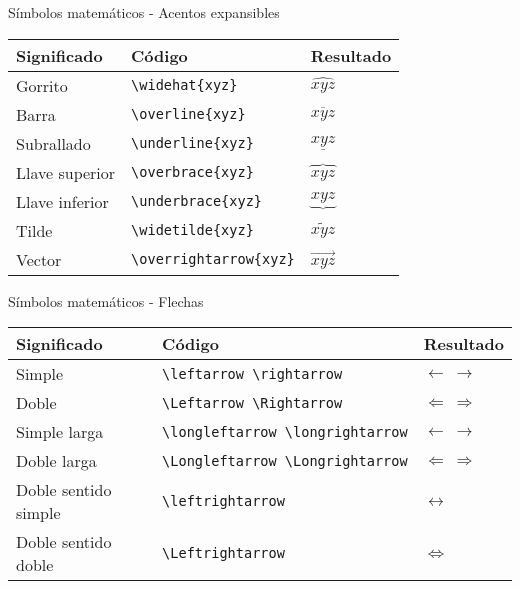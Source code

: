 \documentclass[
  ignorenonframetext,
]{beamer}
\begin{document}
\begin{frame}[fragile]{Símbolos matemáticos - Acentos expansibles}
\protect\hypertarget{suxedmbolos-matemuxe1ticos---acentos-expansibles}{}
\begin{longtable}[]{@{}lll@{}}
\toprule
Significado & Código & Resultado \\
\midrule
\endhead
Gorrito & \texttt{\textbackslash{}widehat\{xyz\}} & \(\widehat{xyz}\) \\
Barra & \texttt{\textbackslash{}overline\{xyz\}} & \(\overline{xyz}\) \\
Subrallado & \texttt{\textbackslash{}underline\{xyz\}} &
\(\underline{xyz}\) \\
Llave superior & \texttt{\textbackslash{}overbrace\{xyz\}} &
\(\overbrace{xyz}\) \\
Llave inferior & \texttt{\textbackslash{}underbrace\{xyz\}} &
\(\underbrace{xyz}\) \\
Tilde & \texttt{\textbackslash{}widetilde\{xyz\}} &
\(\widetilde{xyz}\) \\
Vector & \texttt{\textbackslash{}overrightarrow\{xyz\}} &
\(\overrightarrow{xyz}\) \\
\bottomrule
\end{longtable}
\end{frame}

\begin{frame}[fragile]{Símbolos matemáticos - Flechas}
\protect\hypertarget{suxedmbolos-matemuxe1ticos---flechas}{}
\begin{longtable}[]{@{}
  >{\raggedright\arraybackslash}p{}
  >{\raggedright\arraybackslash}p{}
  >{\raggedright\arraybackslash}p{}@{}}
\toprule
Significado & Código & Resultado \\
\midrule
\endhead
Simple & \texttt{\textbackslash{}leftarrow\ \textbackslash{}rightarrow}
& \(\leftarrow\ \rightarrow\) \\
Doble & \texttt{\textbackslash{}Leftarrow\ \textbackslash{}Rightarrow} &
\(\Leftarrow\ \Rightarrow\) \\
Simple larga &
\texttt{\textbackslash{}longleftarrow\ \textbackslash{}longrightarrow} &
\(\longleftarrow\  \longrightarrow\) \\
Doble larga &
\texttt{\textbackslash{}Longleftarrow\ \textbackslash{}Longrightarrow} &
\(\Longleftarrow\ \Longrightarrow\) \\
Doble sentido simple & \texttt{\textbackslash{}leftrightarrow} &
\(\leftrightarrow\) \\
Doble sentido doble & \texttt{\textbackslash{}Leftrightarrow} &
\(\Leftrightarrow\) \\
\bottomrule
\end{longtable}
\end{frame}
\end{document}
